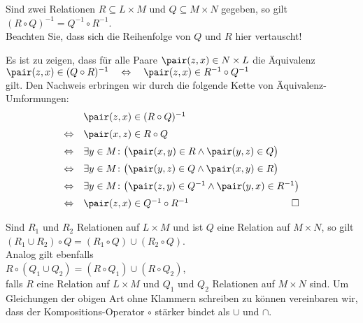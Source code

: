 \begin{Satz}
  Sind zwei Relationen $R \subseteq L \times M$ und $Q \subseteq M \times N$ gegeben, so gilt \\[0.2cm]
  \hspace*{1.3cm} $(R \circ Q)^{-1} = Q^{-1} \circ R^{-1}$. \\[0.2cm]
  Beachten Sie, dass sich die Reihenfolge von $Q$ und $R$ hier vertauscht!  
\end{Satz}

\proof
Es ist zu zeigen, dass f\"{u}r alle Paare $\pair(z,x) \in N \times L$ die  \"{A}quivalenz \\[0.2cm]
\hspace*{1.3cm} 
$\pair(z,x) \in (Q \circ R)^{-1} \quad \Leftrightarrow \quad\pair(z,x) \in R^{-1} \circ Q^{-1}$ 
\\[0.2cm]
gilt.  Den Nachweis erbringen wir durch die folgende Kette von \"{A}quivalenz-Umformungen: 
\[ 
\begin{array}{cl}
                & \pair(z,x) \in (R \circ Q)^{-1}                                             \\[0.2cm]
\Leftrightarrow & \pair(x,z) \in R \circ Q                                                    \\[0.2cm]
\Leftrightarrow & \exists y \in M \colon \bigl(\pair(x,y) \in R \wedge \pair(y,z) \in Q\bigr) \\[0.2cm]
\Leftrightarrow & \exists y \in M \colon \bigl(\pair(y,z) \in Q \wedge \pair(x,y) \in R\bigr) \\[0.2cm]
\Leftrightarrow & \exists y \in M \colon \bigl(\pair(z,y) \in Q^{-1} \wedge \pair(y,x) \in R^{-1}\bigr) 
                  \\[0.2cm]
\Leftrightarrow & \pair(z,x) \in Q^{-1} \circ R^{-1}   \hspace*{\fill} \Box 
\end{array}
\]


\begin{Satz}
  Sind $R_1$ und $R_2$   Relationen auf $L \times M$ und ist $Q$ eine Relation auf $M \times N$, so
  gilt \\[0.2cm] 
  \hspace*{1.3cm}
  $(R_1 \cup R_2) \circ Q = (R_1 \circ Q) \cup (R_2 \circ Q)$. 
  \\[0.2cm]
  Analog gilt ebenfalls \\[0.2cm]
  \hspace*{1.3cm} 
  $R \circ (Q_1 \cup Q_2) = (R \circ Q_1) \cup (R \circ Q_2)$, 
  \\[0.2cm]
  falls $R$ eine Relation auf $L \times M$ und $Q_1$ und $Q_2$ Relationen auf $M \times N$
  sind.  Um Gleichungen der obigen Art ohne Klammern schreiben zu k\"{o}nnen vereinbaren wir, dass der 
  Kompositions-Operator $\circ$ st\"{a}rker bindet als $\cup$ und $\cap$.  
\end{Satz}

